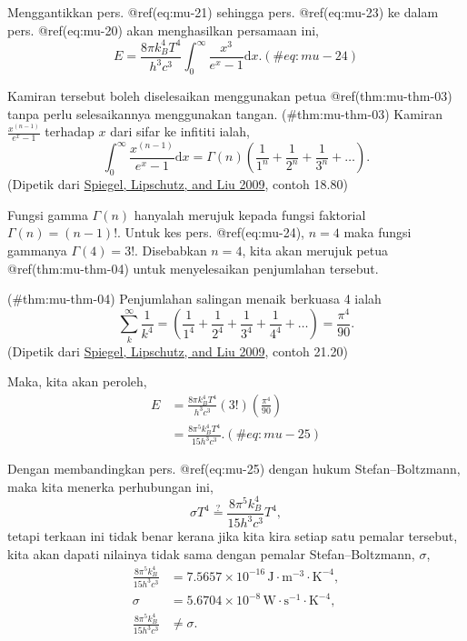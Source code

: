 \documentclass[
]{book}
\begin{document}
Menggantikkan pers. @ref(eq:mu-21) sehingga pers. @ref(eq:mu-23) ke
dalam pers. @ref(eq:mu-20) akan menghasilkan persamaan ini,
\begin{equation}
E = \frac{8 \pi k_B^4 T^4}{h^3c^3}\int_0^\infty \frac{x^3}{e^x-1}\text{d}x.
(\#eq:mu-24)
\end{equation}

Kamiran tersebut boleh diselesaikan menggunakan petua
@ref(thm:mu-thm-03) tanpa perlu selesaikannya menggunakan tangan.
\BeginKnitrBlock{theorem}{}
\protect\hypertarget{thm:mu-thm-03}{}{(\#thm:mu-thm-03)
{} }Kamiran \(\frac{x^{(n-1)}}{e^x-1}\)
terhadap \(x\) dari sifar ke infititi ialah,
\[\int_{0}^{\infty} \frac{x^{(n-1)}}{e^x - 1}\text{d}x = \Gamma(n)\left(\frac{1}{1^n}+\frac{1}{2^n}+\frac{1}{3^n}+\dots\right).\]
(Dipetik dari \protect\hyperlink{ref-spiegel2009}{Spiegel, Lipschutz,
and Liu 2009}, contoh 18.80) 

Fungsi gamma \(\Gamma(n)\) hanyalah merujuk kepada fungsi faktorial
\(\Gamma(n)=(n-1)!\). Untuk kes pers. @ref(eq:mu-24), \(n=4\) maka
fungsi gammanya \(\Gamma(4)=3!\). Disebabkan \(n=4\), kita akan merujuk
petua @ref(thm:mu-thm-04) untuk menyelesaikan penjumlahan tersebut.

\BeginKnitrBlock{theorem}{}

\protect\hypertarget{thm:mu-thm-04}{}{(\#thm:mu-thm-04)
{} }Penjumlahan salingan menaik
berkuasa 4 ialah
\[\sum_{k}^{\infty}\frac{1}{k^4}=\left(\frac{1}{1^4}+\frac{1}{2^4}+\frac{1}{3^4}+\frac{1}{4^4}+\dots\right) = \frac{\pi^4}{90}.\]
(Dipetik dari \protect\hyperlink{ref-spiegel2009}{Spiegel, Lipschutz,
and Liu 2009}, contoh 21.20) 

Maka, kita akan peroleh, \begin{align}
E &= \frac{8\pi k_B^4T^4}{h^3c^3}(3!)\left(\frac{\pi^4}{90}\right) \nonumber\\
 & = \frac{8\pi^5 k_B^4T^4}{15h^3c^3}.
 (\#eq:mu-25)
\end{align}

Dengan membandingkan pers. @ref(eq:mu-25) dengan hukum
Stefan--Boltzmann, maka kita menerka perhubungan ini,
\[\sigma T^4 \stackrel{?}{=} \frac{8\pi^5 k_B^4}{15h^3c^3}T^4,\] tetapi
terkaan ini tidak benar kerana jika kita kira setiap satu pemalar
tersebut, kita akan dapati nilainya tidak sama dengan pemalar
Stefan--Boltzmann, \(\sigma\), \begin{align*}
  \frac{8\pi^5 k_B^4}{15h^3c^3} &= 7.5657\times 10^{-16}\,\text{J}\cdot\text{m}^{-3}\cdot\text{K}^{-4},\\
  \sigma &= 5.6704\times 10^{-8}\,\text{W}\cdot\text{s}^{-1}\cdot\text{K}^{-4},\\
  \frac{8\pi^5 k_B^4}{15h^3c^3} &\neq \sigma.
\end{align*}
\end{document}
